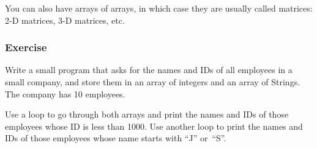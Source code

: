 You can also have arrays of arrays, in which case they are usually
called matrices: 2-D matrices, 3-D matrices, etc. 



\subsubsection{Exercise}
\label{sec:exercisejfjfj}

Write a small program that asks for the names and IDs of all employees
in a small company, and store them in an array of integers and an
array of Strings. The company has 10 employees.

Use a loop to go through both arrays and print the names and IDs of
those employees whose ID is less than 1000. Use another loop to print
the names and IDs of those employees whose name starts with ``J''
or~``S''. 



